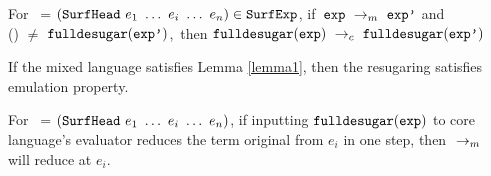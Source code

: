 \begin{lemma}
\label{lemma1}

For~ = $(\mbox{\tt SurfHead}~e_1~\ldots~e_i~\ldots~e_n)\in\mbox{\tt SurfExp}$, if~$\mbox{\tt exp} ~\rightarrow_m~\mbox{\tt exp'}$ and\\ () $\not=$ $\mbox{\tt fulldesugar}(\mbox{\tt exp'})$,~then $\mbox{\tt fulldesugar}(\mbox{\tt exp}) ~\rightarrow_c~\mbox{\tt fulldesugar}(\mbox{\tt exp'})$

\end{lemma}

\begin{Def}[Emulation]
If the mixed language satisfies Lemma \ref{lemma1}, then the resugaring satisfies emulation property.
\end{Def}

\begin{lemma}
\label{lemma2}

For~ = $(\mbox{\tt SurfHead}~e_1~\ldots~e_i~\ldots~e_n)$, if inputting $\mbox{\tt fulldesugar}(\mbox{\tt exp})$ to core language's evaluator reduces the term original from $e_i$ in one step, then $~\rightarrow_m~$ will reduce  at $e_i$.

\end{lemma}

